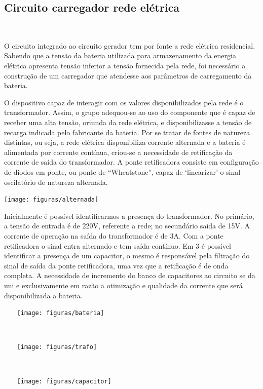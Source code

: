 \subsection{Circuito carregador rede elétrica}  

O circuito integrado ao circuito gerador tem por fonte a rede elétrica residencial. Sabendo que a tensão da bateria utilizada para armazenamento da energia elétrica apresenta tensão inferior a tensão fornecida pela rede, foi necessário a construção de um carregador que atendesse aos parâmetros de carregamento da bateria.

O dispositivo capaz de interagir com os valores disponibilizados pela rede é o transformador. Assim, o grupo adequou-se ao uso do componente que é capaz de receber uma alta tensão, oriunda da rede elétrica, e disponibilizasse a tensão de recarga indicada pelo fabricante da bateria. Por se tratar de fontes de natureza distintas, ou seja, a rede elétrica disponibiliza corrente alternada e a bateria é alimentada por corrente contínua, criou-se a necessidade de retificação da corrente de saída do transformador. A ponte retificadora consiste em configuração de diodos em ponte, ou ponte de “Wheatstone”, capaz de ‘linearizar’ o sinal oscilatório de natureza alternada.
                            
        
\begin{center}
\texttt{[image: figuras/alternada]}
\label{alternada}
\end{center}

Inicialmente é possível identificarmos a presença do transformador. No primário, a tensão de entrada é de 220V, referente a rede; no secundário saída de 15V. A corrente de operação na saída do transformador é de 3A. Com a ponte retificadora o sinal entra alternado e tem saída contínuo. Em 3 é possível identificar a presença de um capacitor, o mesmo é responsável pela filtração do sinal de saída da ponte retificadora, uma vez que a retificação é de onda completa. A necessidade de incremento do banco de capacitores ao circuito se da uni e exclusivamente em razão a otimização e qualidade da corrente que será disponibilizada a bateria.     
                                         
  \begin{center}
    \texttt{[image: figuras/bateria]}
       \label{bateria}
   \end{center}
                                            
\begin{center}
    \texttt{[image: figuras/trafo]}
       \label{trafo}
   \end{center}
                           
                                       
 \begin{center}
    \texttt{[image: figuras/capacitor]}
       \label{capacitor}
   \end{center}

